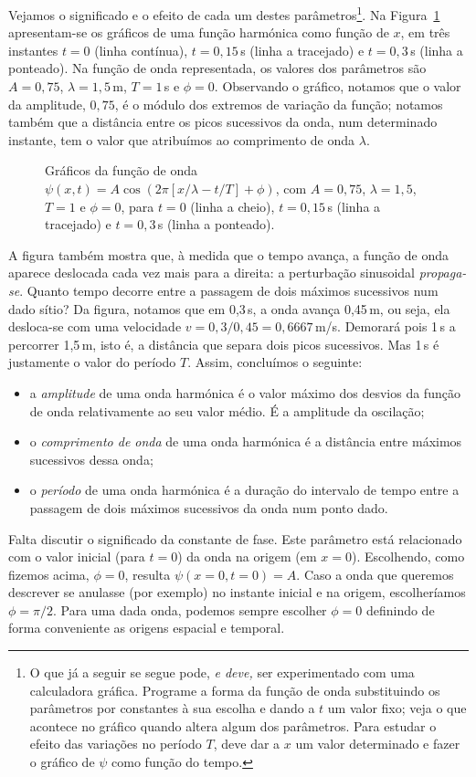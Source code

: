 Vejamos o significado e o efeito de cada um destes parâmetros\footnote{O que já
a seguir se segue pode, \emph{e deve,} ser experimentado com uma calculadora
gráfica. Programe a forma da função de onda substituindo os parâmetros por
constantes à sua escolha e dando a $t$ um valor fixo; veja o que acontece no
gráfico quando altera algum dos parâmetros. Para estudar o efeito das variações
no período $T$, deve dar a $x$ um valor determinado e fazer o gráfico de $\psi$
como função do tempo.}.
Na Figura~\ref{fig:01-030} apresentam-se os gráficos de uma função harmónica
como função de $x$, em três instantes $t=0$ (linha contínua), $t=0,15$\,s (linha
a tracejado) e $t=0,3$\,s (linha a ponteado). Na função de onda representada, os
valores dos parâmetros são $A=0,75$, $\lambda=1,5$\,m, $T=1$\,s e $\phi=0$.
Observando o gráfico, notamos que o valor da amplitude, $0,75$, é o módulo dos
extremos de variação da função; notamos também que a distância entre os picos
sucessivos da onda, num determinado instante, tem o valor que atribuímos ao
comprimento de onda $\lambda$.
\begin{figure}[htb]
{\centering
    \par
}
\caption{Gráficos da função de onda
$\psi(x,t)=A\cos(2\pi[x/\lambda-t/T]+\phi)$, com $A=0,75$, $\lambda=1,5$, $T=1$
e $\phi=0$, para $t=0$ (linha a cheio), $t=0,15$\,s (linha a tracejado) e
$t=0,3$\,s (linha a ponteado).\label{fig:01-030}}
\end{figure}
A figura também mostra que, à medida que o tempo avança, a função de onda
aparece deslocada cada vez mais para a direita: a perturbação sinusoidal
\emph{propaga-se}. Quanto tempo decorre entre a passagem de dois máximos
sucessivos num dado sítio? Da figura, notamos que em 0,3\,s, a onda avança
0,45\,m, ou seja, ela desloca-se com uma velocidade $v = 0,3/0,45=0,6667$\,m/s.
Demorará pois 1\,s a percorrer 1,5\,m, isto é, a distância que separa dois picos
sucessivos. Mas 1\,s é justamente o valor do período $T$. Assim, concluímos o
seguinte:
\begin{itemize}
\item
    a \emph{amplitude} de uma onda harmónica é o valor máximo dos desvios da
    função de onda relativamente ao seu valor médio. É a amplitude da oscilação;
\item
    o \emph{comprimento de onda} de uma onda harmónica é a distância entre
    máximos sucessivos dessa onda;
\item
    o \emph{período} de uma onda harmónica é a duração do intervalo de tempo
    entre a passagem de dois máximos sucessivos da onda num ponto dado.
\end{itemize}
Falta discutir o significado da constante de fase. Este parâmetro está
relacionado com o valor inicial (para $t=0$) da onda na origem (em $x=0$).
Escolhendo, como fizemos acima, $\phi=0$, resulta $\psi(x=0,t=0)=A$. Caso a onda
que queremos descrever se anulasse (por exemplo) no instante inicial e na
origem, escolheríamos $\phi=\pi/2$. Para uma dada onda, podemos sempre escolher
$\phi=0$ definindo de forma conveniente as origens espacial e temporal.
 
